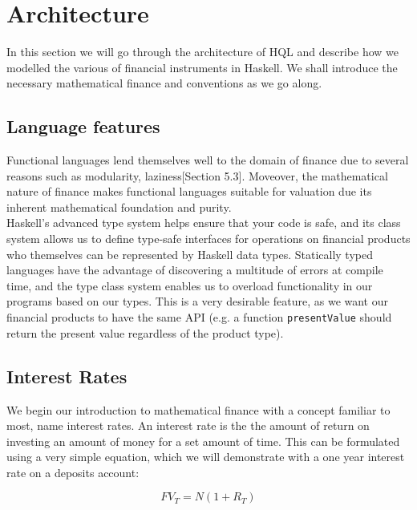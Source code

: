 \chapter{Architecture}

In this section we will go through the architecture of HQL and describe how we
modelled the various of financial instruments in Haskell. We shall introduce
the necessary mathematical finance and conventions as we go along.

\section{Language features}

Functional languages lend themselves well to the domain of finance due
to several reasons such as modularity\cite{hughes:matters-cj}, 
laziness\cite{composingcontracts}[Section 5.3]. Moveover, the mathematical
 nature of finance makes functional languages suitable for valuation due its
inherent mathematical foundation and purity.\\

Haskell's advanced type system helps ensure that your code is safe, and its 
class system allows us to define type-safe interfaces for operations on 
financial products who themselves can be represented by Haskell data types. 
Statically typed languages have the advantage of discovering a multitude of
errors at compile time, and the type class system enables us to overload 
functionality in our programs based on our types. This is a very desirable
feature, as we want our financial products to have the same API (e.g. a function 
\texttt{presentValue} should return the present value regardless of the product 
type).\\

\section{Interest Rates}

We begin our introduction to mathematical finance with a concept familiar to
most, name interest rates. An interest rate is the the amount of return on
investing an amount of money for a set amount of time. This can be formulated
using a very simple equation, which we will demonstrate with a one year interest
rate on a deposits account:

\begin{equation}
FV_T = N (1 + R_T)
\end{equation}

